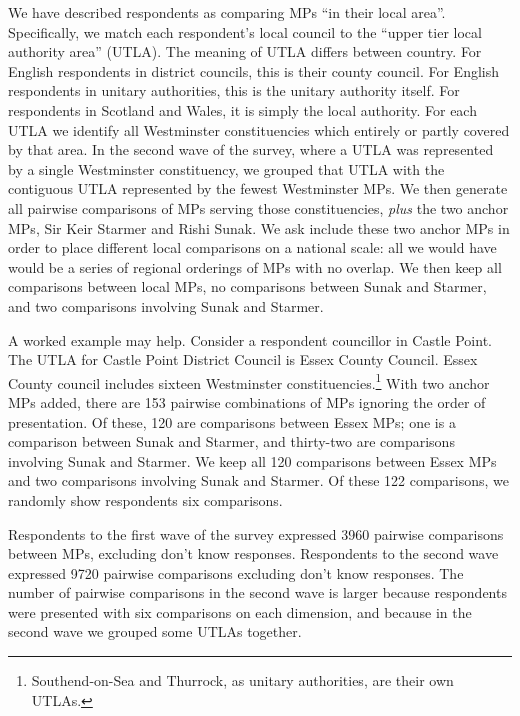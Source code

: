 \documentclass[
]{article}
\begin{document}
We have described respondents as comparing MPs ``in their local area''.
Specifically, we match each respondent's local council to the ``upper
tier local authority area'' (UTLA). The meaning of UTLA differs between
country. For English respondents in district councils, this is their
county council. For English respondents in unitary authorities, this is
the unitary authority itself. For respondents in Scotland and Wales, it
is simply the local authority. For each UTLA we identify all Westminster
constituencies which entirely or partly covered by that area. In the
second wave of the survey, where a UTLA was represented by a single
Westminster constituency, we grouped that UTLA with the contiguous UTLA
represented by the fewest Westminster MPs. We then generate all pairwise
comparisons of MPs serving those constituencies, \emph{plus} the two
anchor MPs, Sir Keir Starmer and Rishi Sunak. We ask include these two
anchor MPs in order to place different local comparisons on a national
scale: all we would have would be a series of regional orderings of MPs
with no overlap. We then keep all comparisons between local MPs, no
comparisons between Sunak and Starmer, and two comparisons involving
Sunak and Starmer.

A worked example may help. Consider a respondent councillor in Castle
Point. The UTLA for Castle Point District Council is Essex County
Council. Essex County council includes sixteen Westminster
constituencies.\footnote{Southend-on-Sea and Thurrock, as unitary
  authorities, are their own UTLAs.} With two anchor MPs added, there
are 153 pairwise combinations of MPs ignoring the order of presentation.
Of these, 120 are comparisons between Essex MPs; one is a comparison
between Sunak and Starmer, and thirty-two are comparisons involving
Sunak and Starmer. We keep all 120 comparisons between Essex MPs and two
comparisons involving Sunak and Starmer. Of these 122 comparisons, we
randomly show respondents six comparisons.

Respondents to the first wave of the survey expressed 3960 pairwise
comparisons between MPs, excluding don't know responses. Respondents to
the second wave expressed 9720 pairwise comparisons excluding don't know
responses. The number of pairwise comparisons in the second wave is
larger because respondents were presented with six comparisons on each
dimension, and because in the second wave we grouped some UTLAs
together.
\end{document}
